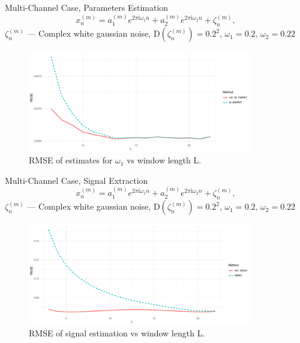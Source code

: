 \documentclass[pdf, unicode, ucs, notheorems]{beamer}
\theoremstyle{definition}
\begin{document}
\begin{frame}{Multi-Channel Case, Parameters Estimation}
  \vspace*{-0.3cm}
  \[
    x_{n}^{(m)} = a_1^{(m)}
    e^{2 \pi \mathrm{i} \omega_1 n} +
    a_2^{(m)}
    e^{2 \pi \mathrm{i} \omega_2 n} + \zeta_n^{(m)},
  \]
  $\zeta_n^{(m)}$ --- Complex white gaussian noise,
  $\mathrm{D}\left(\zeta_n^{(m)}\right) = 0.2^2$, $\omega_1 = 0.2,\,
  \omega_2 = 0.22$
  \begin{figure}[!ht]
    \centering
    \includegraphics[width=0.87\textwidth]{img/freq1_L_no_rates.pdf}
    \caption{RMSE of estimates for $\omega_1$ vs window length L.}
  \end{figure}
\end{frame}

\begin{frame}{Multi-Channel Case, Signal Extraction}
  \vspace*{-0.3cm}
  \[
    x_{n}^{(m)} = a_1^{(m)}
    e^{2 \pi \mathrm{i} \omega_1 n} +
    a_2^{(m)}
    e^{2 \pi \mathrm{i} \omega_2 n} + \zeta_n^{(m)},
  \]
  $\zeta_n^{(m)}$ --- Complex white gaussian noise,
  $\mathrm{D}\left(\zeta_n^{(m)}\right) = 0.2^2$, $\omega_1 = 0.2,\,
  \omega_2 = 0.22$
  \begin{figure}[!ht]
    \centering
    \includegraphics[width=0.87\textwidth]{img/rec_L_rmse_no_rates.pdf}
    \caption{RMSE of signal estimation vs window length L.}
  \end{figure}
\end{frame}
\end{document}
